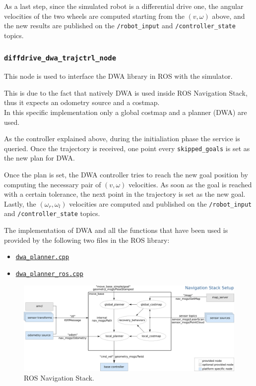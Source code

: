 \documentclass[11pt,a4paper]{article}
\begin{document}
As a last step, since the simulated robot is a differential drive one, the angular velocities of the two wheels are computed starting from the $(v, \omega)$ above, and the new results are published on the \texttt{/robot\_input} and \texttt{/controller\_state} topics.

\subsubsection{\texttt{diffdrive\_dwa\_trajctrl\_node}}

This node is used to interface the DWA library in ROS with the simulator.

This is due to the fact that natively DWA is used inside ROS Navigation Stack, thus it expects an odometry source and a costmap.\\

In this specific implementation only a global costmap and a planner (DWA) are used.

As the controller explained above, during the initialiation phase the service is queried. Once the trajectory is received, one point every \texttt{skipped\_goals} is set as the new plan for DWA.

Once the plan is set, the DWA controller tries to reach the new goal position by computing the necessary pair of $(v, \omega)$ velocities. As soon as the goal is reached with a certain tolerance, the next point in the trajectory is set as the new goal.\\

Lastly, the $(\omega_r,\omega_l)$ velocities are computed and published on the \texttt{/robot\_input} and \texttt{/controller\_state} topics.

The implementation of DWA and all the functions that have been used is provided by the following two files in the ROS library:
\begin{itemize}
 \item \href{https://docs.ros.org/en/melodic/api/dwa\_local\_planner/html/dwa\_\_planner\_8cpp\_source.html}{\texttt{dwa\_planner.cpp}}
 \item \href{https://docs.ros.org/en/melodic/api/dwa\_local\_planner/html/dwa\_\_planner\_\_ros\_8cpp\_source.html}{\texttt{dwa\_planner\_ros.cpp}}
\end{itemize}

\begin{figure}[H]
    \centering
    \includegraphics[scale=0.4]{other/navigation_stack.png}
    \caption{ROS Navigation Stack.}
\end{figure}
\end{document}
